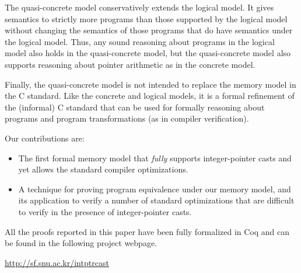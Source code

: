 The quasi-concrete model conservatively extends the logical model.  It
gives semantics to strictly more programs than those supported by the
logical model without changing the semantics of those programs that do
have semantics under the logical model. Thus, any sound reasoning
about programs in the logical model also holds in the quasi-concrete
model, but the quasi-concrete model also supports reasoning about
pointer arithmetic as in the concrete model.

Finally, the quasi-concrete model is not intended to replace the
memory model in the C standard. Like the concrete and logical models,
it is a formal refinement of the (informal) C standard that can be
used for formally reasoning about programs and program transformations
(as in compiler verification).

\medskip \noindent
Our contributions are:
\begin{itemize}
\item The first formal memory model that \emph{fully} supports
  integer-pointer casts and yet allows the standard compiler
  optimizations.
\item A technique for proving program equivalence under our memory
model, and its application to verify a number of standard optimizations
that are difficult to verify in the presence of integer-pointer casts.
\end{itemize}

All the proofs reported in this paper have been fully formalized in
Coq and can be found in the following project webpage.
\begin{center}
\url{http://sf.snu.ac.kr/intptrcast}
\end{center}

%
%
%
%


